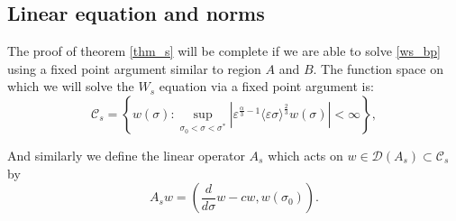 \documentclass[letterpaper,11pt]{article}
\newcommand{\eps}{\varepsilon}
\numberwithin{equation}{section}
\theoremstyle{plain}
\begin{document}
\subsection{Linear equation and norms}
The proof of theorem \ref{thm_s} will be complete if we are able to solve \eqref{ws_bp} using a fixed point argument similar to region $A$ and $B$. The function space on which we will solve the $W_s$ equation via a fixed point argument is:
\[
\mathcal{C}_s = \left\{ w(\sigma) : \sup_{\sigma_0 < \sigma <\sigma^*} |\eps^{\frac{\alpha}{3} -1 }\langle \eps\sigma \rangle^{\frac{2}{3}} w(\sigma)|<\infty \right\},
\]


And similarly we define the linear operator $A_s$ which acts on $w \in \mathcal{D}(A_s) \subset \mathcal{C}_s$ by \[
A_s w = \left(\frac{d}{d\sigma}w - cw, w(\sigma_0)\right).
\]
\end{document}
